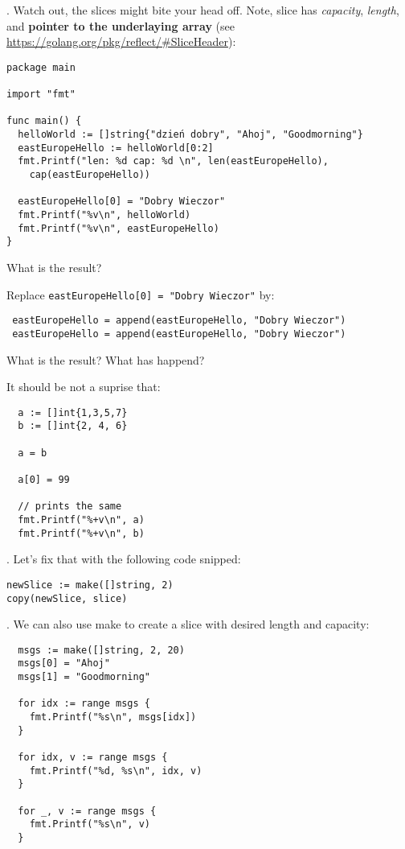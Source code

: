 \documentclass[11pt, letterpaper]{article}
\begin{document}
. Watch out, the slices might bite your head off. Note, slice has \emph{capacity}, \emph{length}, and \textbf{pointer to the underlaying array} (see \href{reflect.SliceHeader}{https://golang.org/pkg/reflect/\#SliceHeader}):
\begin{verbatim}
package main

import "fmt"

func main() {
  helloWorld := []string{"dzień dobry", "Ahoj", "Goodmorning"}
  eastEuropeHello := helloWorld[0:2]
  fmt.Printf("len: %d cap: %d \n", len(eastEuropeHello),
    cap(eastEuropeHello))

  eastEuropeHello[0] = "Dobry Wieczor"
  fmt.Printf("%v\n", helloWorld)
  fmt.Printf("%v\n", eastEuropeHello)
}
\end{verbatim}
What is the result?

\bigskip
\bigskip
Replace \texttt{eastEuropeHello[0] = "Dobry Wieczor"} by:
\begin{verbatim}
 eastEuropeHello = append(eastEuropeHello, "Dobry Wieczor")
 eastEuropeHello = append(eastEuropeHello, "Dobry Wieczor")
\end{verbatim}

What is the result? What has happend?

\bigskip
\bigskip
\bigskip
It should be not a suprise that: 

\begin{verbatim}
  a := []int{1,3,5,7}
  b := []int{2, 4, 6}

  a = b

  a[0] = 99

  // prints the same
  fmt.Printf("%+v\n", a)
  fmt.Printf("%+v\n", b)
\end{verbatim}

. Let's fix that with the following code snipped:

\begin{verbatim}
newSlice := make([]string, 2)
copy(newSlice, slice)
\end{verbatim}

. We can also use make to create a slice with desired length and capacity:

\begin{verbatim}
  msgs := make([]string, 2, 20)
  msgs[0] = "Ahoj"
  msgs[1] = "Goodmorning"

  for idx := range msgs {
    fmt.Printf("%s\n", msgs[idx])
  }

  for idx, v := range msgs {
    fmt.Printf("%d, %s\n", idx, v)
  }

  for _, v := range msgs {
    fmt.Printf("%s\n", v)
  }
\end{verbatim}
\end{document}
